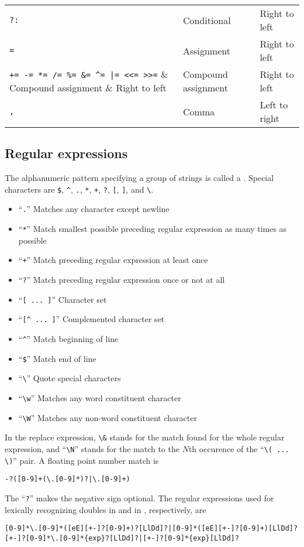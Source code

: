 \documentclass[12pt,twoside]{article}
\begin{document}
\begin{table}
\begin{minipage}{\hsize}
\begin{center}
\begin{tabular}{ >{\ttfamily}l<{} l l }
\verb'?:' & Conditional & Right to left \\[0.1ex]
\verb'=' & Assignment & Right to left \\[0.1ex]
\verb'+= -= *= /= %= &= ^= |= <<= >>=' & Compound assignment & Right to left \\[0.1ex]
\verb',' & Comma & Left to right \\[0.1ex]
\hline
\end{tabular}
\end{center}
\end{minipage}
\end{table} %

\subsection{Regular expressions}\label{sxn:rx}
The alphanumeric pattern specifying a group of strings is called a
.
Special characters are \verb'$', \verb'^', \verb'.', \verb'*',
\verb'+', \verb'?', \verb'[', \verb']', and \verb'\'.
\begin{itemize}
\item ``\verb'.''' Matches any character except newline %
\item ``\verb'*''' Match smallest possible preceding regular expression as many times as possible %
\item ``\verb'+''' Match preceding regular expression at least once %
\item ``\verb'?''' Match preceding regular expression once or not at all %
\item ``\verb'[ ... ]''' Character set %
\item ``\verb'[^ ... ]''' Complemented character set %
\item ``\verb'^''' Match beginning of line %
\item ``\verb'$''' Match end of line %
\item ``\verb'\''' Quote special characters %
\item ``\verb'\w''' Matches any word constituent character %
\item ``\verb'\W''' Matches any non-word constituent character %
\end{itemize}
In the replace expression, \verb'\&' stands for the match found for
the whole regular expression, and ``\verb'\N''' stands for the match
to the $N$th occurence of the ``\verb'\( ... \)''' pair.
A floating point number match is \cite[][p.~128]{Fri97}
\begin{verbatim}
-?([0-9]+(\.[0-9]*)?|\.[0-9]+)
\end{verbatim}
The ``\verb'?''' makes the negative sign optional.
The regular expressions used for lexically recognizing doubles
in  and in , respectively, are
\begin{verbatim}
[0-9]*\.[0-9]*([eE][+-]?[0-9]+)?[LlDd]?|[0-9]*([eE][+-]?[0-9]+)[LlDd]?
[+-]?[0-9]*\.[0-9]*{exp}?[LlDd]?|[+-]?[0-9]*{exp}[LlDd]?
\end{verbatim}
\end{document}
